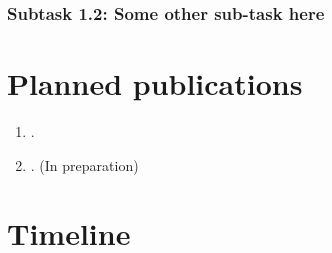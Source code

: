 \blindtext




\subsubsection*{Subtask 1.2: Some other sub-task here}

\blindtext










\section{Planned publications}

\begin{enumerate} [leftmargin=0.75cm,itemsep=0pt]
    \item {}.
    \item {}. \hfill (In preparation)
\end{enumerate}






\section{Timeline}

